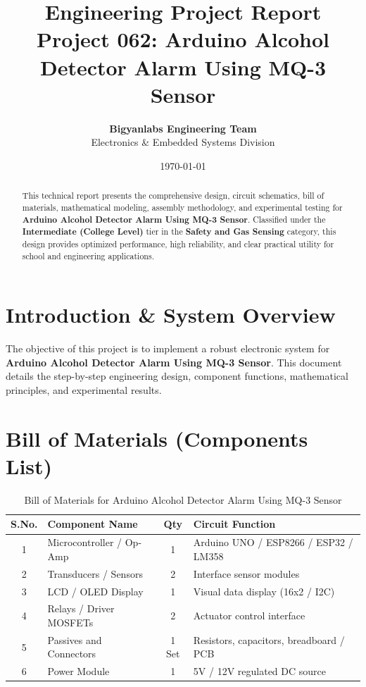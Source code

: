 \documentclass[11pt,a4paper]{article}
\title{\textbf{\Huge Engineering Project Report}\\[0.5em] \Large Project 062: Arduino Alcohol Detector Alarm Using MQ-3 Sensor}
\author{\textbf{Bigyanlabs Engineering Team}\\ Electronics \& Embedded Systems Division}
\date{\today}
\begin{document}
\maketitle
\thispagestyle{empty}

\begin{abstract}
This technical report presents the comprehensive design, circuit schematics, bill of materials, mathematical modeling, assembly methodology, and experimental testing for \textbf{Arduino Alcohol Detector Alarm Using MQ-3 Sensor}. Classified under the \textbf{Intermediate (College Level)} tier in the \textbf{Safety and Gas Sensing} category, this design provides optimized performance, high reliability, and clear practical utility for school and engineering applications.
\end{abstract}

\newpage
\tableofcontents
\newpage

\section{Introduction \& System Overview}
The objective of this project is to implement a robust electronic system for \textbf{Arduino Alcohol Detector Alarm Using MQ-3 Sensor}. This document details the step-by-step engineering design, component functions, mathematical principles, and experimental results.

\section{Bill of Materials (Components List)}
\begin{table}[h!]
\centering
\caption{Bill of Materials for Arduino Alcohol Detector Alarm Using MQ-3 Sensor}
\vspace{0.5em}
\begin{tabular}{clcp{7cm}}
\toprule
\textbf{S.No.} & \textbf{Component Name} & \textbf{Qty} & \textbf{Circuit Function} \\
\midrule
1 & Microcontroller / Op-Amp & 1 & Arduino UNO / ESP8266 / ESP32 / LM358 \\
2 & Transducers / Sensors & 2 & Interface sensor modules \\
3 & LCD / OLED Display & 1 & Visual data display (16x2 / I2C) \\
4 & Relays / Driver MOSFETs & 2 & Actuator control interface \\
5 & Passives and Connectors & 1 Set & Resistors, capacitors, breadboard / PCB \\
6 & Power Module & 1 & 5V / 12V regulated DC source \\
\bottomrule
\end{tabular}
\end{table}
\end{document}
